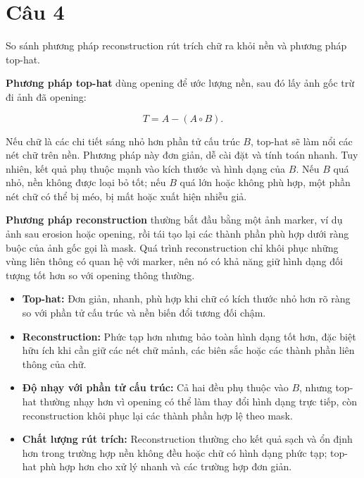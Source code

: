\section*{Câu 4}
So sánh phương pháp reconstruction rút trích chữ ra khỏi nền và phương pháp top-hat.

\textbf{Phương pháp top-hat} dùng opening để ước lượng nền, sau đó lấy ảnh gốc trừ đi ảnh đã opening:

\begin{equation}
    T = A - (A \circ B).
\end{equation}

Nếu chữ là các chi tiết sáng nhỏ hơn phần tử cấu trúc $B$, top-hat sẽ làm nổi các nét chữ trên nền. Phương pháp này đơn giản, dễ cài đặt và tính toán nhanh. Tuy nhiên, kết quả phụ thuộc mạnh vào kích thước và hình dạng của $B$. Nếu $B$ quá nhỏ, nền không được loại bỏ tốt; nếu $B$ quá lớn hoặc không phù hợp, một phần nét chữ có thể bị méo, bị mất hoặc xuất hiện nhiễu giả.

\textbf{Phương pháp reconstruction} thường bắt đầu bằng một ảnh marker, ví dụ ảnh sau erosion hoặc opening, rồi tái tạo lại các thành phần phù hợp dưới ràng buộc của ảnh gốc gọi là mask. Quá trình reconstruction chỉ khôi phục những vùng liên thông có quan hệ với marker, nên nó có khả năng giữ hình dạng đối tượng tốt hơn so với opening thông thường.

\begin{itemize}
    \item \textbf{Top-hat:} Đơn giản, nhanh, phù hợp khi chữ có kích thước nhỏ hơn rõ ràng so với phần tử cấu trúc và nền biến đổi tương đối chậm.

    \item \textbf{Reconstruction:} Phức tạp hơn nhưng bảo toàn hình dạng tốt hơn, đặc biệt hữu ích khi cần giữ các nét chữ mảnh, các biên sắc hoặc các thành phần liên thông của chữ.

    \item \textbf{Độ nhạy với phần tử cấu trúc:} Cả hai đều phụ thuộc vào $B$, nhưng top-hat thường nhạy hơn vì opening có thể làm thay đổi hình dạng trực tiếp, còn reconstruction khôi phục lại các thành phần hợp lệ theo mask.

    \item \textbf{Chất lượng rút trích:} Reconstruction thường cho kết quả sạch và ổn định hơn trong trường hợp nền không đều hoặc chữ có hình dạng phức tạp; top-hat phù hợp hơn cho xử lý nhanh và các trường hợp đơn giản.
\end{itemize}